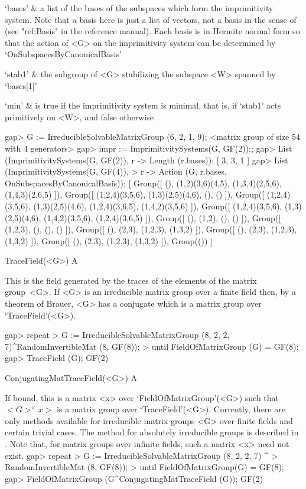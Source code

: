 \beginitems
`bases' & a list of the bases of the subspaces which form the imprimitivity system. 
          Note that a basis here is just a list of vectors, not a basis in the sense of
          {\GAP} (see "ref:Basis" in the {\GAP} reference manual). Each basis is
          in Hermite normal form so that the action of <G> on the imprimitivity
          system can be determined by `OnSubspacesByCanonicalBasis'
          
`stab1' & the subgroup of <G> stabilizing the subspace <W> spanned by `bases[1]'

`min'   & is true if the imprimitivity system is minimal, that is, if `stab1' 
          acts primitively on <W>, and false otherwise 
\enditems

\beginexample
gap> G := IrreducibleSolvableMatrixGroup (6, 2, 1, 9);
<matrix group of size 54 with 4 generators>
gap> impr := ImprimitivitySystems(G, GF(2));;
gap> List (ImprimitivitySystems(G, GF(2)), r -> Length (r.bases));
[ 3, 3, 1 ]
gap> List (ImprimitivitySystems(G, GF(4)), 
>        r -> Action (G, r.bases, OnSubspacesByCanonicalBasis));
[ Group([ (), (1,2)(3,6)(4,5), (1,3,4)(2,5,6), (1,4,3)(2,6,5) ]), 
  Group([ (1,2,4)(3,5,6), (1,3)(2,5)(4,6), (), () ]), 
  Group([ (1,2,4)(3,5,6), (1,3)(2,5)(4,6), (1,2,4)(3,6,5), (1,4,2)(3,5,6) ]), 
  Group([ (1,2,4)(3,5,6), (1,3)(2,5)(4,6), (1,4,2)(3,5,6), (1,2,4)(3,6,5) ]), 
  Group([ (), (1,2), (), () ]), Group([ (1,2,3), (), (), () ]), 
  Group([ (), (2,3), (1,2,3), (1,3,2) ]), 
  Group([ (), (2,3), (1,2,3), (1,3,2) ]), 
  Group([ (), (2,3), (1,2,3), (1,3,2) ]), Group(()) ]
\endexample



\>TraceField(<G>) A

This is the field generated by the traces of the elements of the matrix group~<G>. 
If <G> is an irreducible matrix group over a finite field then, by a theorem of Brauer, <G>
has a conjugate which is a matrix group over `TraceField'(<G>).

\beginexample
gap> repeat
>        G := IrreducibleSolvableMatrixGroup (8, 2, 2, 7)^RandomInvertibleMat (8, GF(8));
>    until FieldOfMatrixGroup (G) = GF(8);
gap> TraceField (G);
GF(2)
\endexample

\>ConjugatingMatTraceField(<G>) A

If bound, this is a matrix <x> over `FieldOfMatrixGroup'(<G>) such that
$<G>^<x>$ is a  matrix group over `TraceField'(<G>). Currently, there are
only methods available for irreducible matrix groups <G> over finite fields
and certain trivial cases.
The method for absolutely irreducible groups is described in
\cite{GH}. 
Note that, for matrix groups over infinite fields, such a matrix <x> 
need not exist.
\beginexample
gap> repeat
>       G := IrreducibleSolvableMatrixGroup (8, 2, 2, 7) ^ 
>                RandomInvertibleMat (8, GF(8));
>    until FieldOfMatrixGroup(G) = GF(8);
gap> FieldOfMatrixGroup (G^ConjugatingMatTraceField (G));
GF(2)
\endexample


